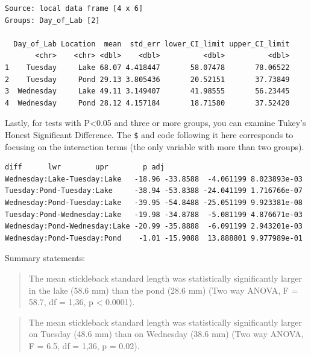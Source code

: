 \documentclass[twoside, 12pt]{article}
\newenvironment{Shaded}{\begin{snugshade}}{\end{snugshade}}
\newcommand{\KeywordTok}[1]{\textcolor[rgb]{0.13,0.29,0.53}{\textbf{{#1}}}}
\newcommand{\DataTypeTok}[1]{\textcolor[rgb]{0.13,0.29,0.53}{{#1}}}
\newcommand{\StringTok}[1]{\textcolor[rgb]{0.31,0.60,0.02}{{#1}}}
\newcommand{\NormalTok}[1]{{#1}}
\begin{document}
\begin{Verbatim}[frame=single]
Source: local data frame [4 x 6]
Groups: Day_of_Lab [2]

  Day_of_Lab Location  mean  std_err lower_CI_limit upper_CI_limit
       <chr>    <chr> <dbl>    <dbl>          <dbl>          <dbl>
1    Tuesday     Lake 68.07 4.418447       58.07478       78.06522
2    Tuesday     Pond 29.13 3.805436       20.52151       37.73849
3  Wednesday     Lake 49.11 3.149407       41.98555       56.23445
4  Wednesday     Pond 28.12 4.157184       18.71580       37.52420
\end{Verbatim}

Lastly, for tests with P\textless{}0.05 and three or more groups, you
can examine Tukey's Honest Significant Difference. The \texttt{\$} and
code following it here corresponds to focusing on the interaction terms
(the only variable with more than two groups).

\begin{Shaded}
\end{Shaded}

\begin{Verbatim}[frame=single]
                                diff      lwr        upr        p adj
Wednesday:Lake-Tuesday:Lake   -18.96 -33.8588  -4.061199 8.023893e-03
Tuesday:Pond-Tuesday:Lake     -38.94 -53.8388 -24.041199 1.716766e-07
Wednesday:Pond-Tuesday:Lake   -39.95 -54.8488 -25.051199 9.923381e-08
Tuesday:Pond-Wednesday:Lake   -19.98 -34.8788  -5.081199 4.876671e-03
Wednesday:Pond-Wednesday:Lake -20.99 -35.8888  -6.091199 2.943201e-03
Wednesday:Pond-Tuesday:Pond    -1.01 -15.9088  13.888801 9.977989e-01
\end{Verbatim}

Summary statements:

\begin{quote}
The mean stickleback standard length was statistically significantly
larger in the lake (58.6 mm) than the pond (28.6 mm) (Two way ANOVA, F =
58.7, df = 1,36, p \textless{} 0.0001).
\end{quote}

\begin{quote}
The mean stickleback standard length was statistically significantly
larger on Tuesday (48.6 mm) than on Wednesday (38.6 mm) (Two way ANOVA,
F = 6.5, df = 1,36, p = 0.02).
\end{quote}
\end{document}

